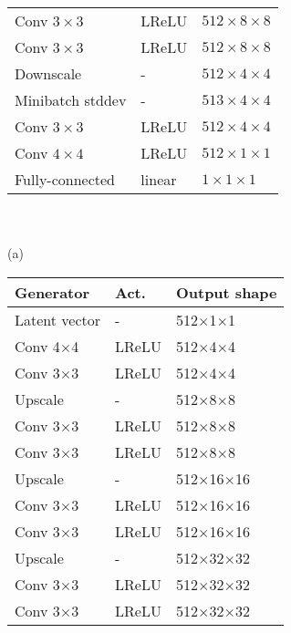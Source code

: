 \documentclass[journal, onecolumn]{IEEEtran}
\begin{document}
\begin{table}[H]
\begin{minipage}[t]{0.48\linewidth}
\begin{adjustbox}{width=0.72\columnwidth,left}
{\begin{tabular}[t]{|lll|}
Conv $3\times3$      & LReLU & $512\times8\times8$      \\
Conv $3\times3$      & LReLU & $512\times8\times8$      \\ 
Downscale & -      & $512\times4\times4$  \\ \hline

Minibatch stddev &- & $513\times4\times4$  \\ 
Conv $3\times3$      & LReLU & $512\times4\times4$      \\
Conv $4\times4$      & LReLU & $512\times1\times1$      \\ 
Fully-connected & linear      & $1\times1\times1$  \\ \hline
\end{tabular}
\\
\\
(a)
}
\end{adjustbox}
\end{minipage}
\hspace{-0.95cm}
\begin{minipage}[t]{0.48\linewidth}
\centering
\begin{adjustbox}{width=0.72\columnwidth,center}
\noindent\parbox[t][][t]{0.74\linewidth}{
\begin{tabular}[t]{|lll|}
\hline
\textbf{Generator}       & Act.  & Output shape \\ \hline
Latent vector  & -      & 512$\times$1$\times$1      \\
Conv 4$\times$4      & LReLU & 512$\times$4$\times$4     \\
Conv 3$\times$3      & LReLU & 512$\times$4$\times$4      \\ \hline

Upscale          & -      & 512$\times$8$\times$8  \\
Conv 3$\times$3      & LReLU & 512$\times$8$\times$8      \\
Conv 3$\times$3      & LReLU & 512$\times$8$\times$8      \\ \hline

Upscale          & -      & 512$\times$16$\times$16  \\
Conv 3$\times$3      & LReLU & 512$\times$16$\times$16      \\
Conv 3$\times$3      & LReLU & 512$\times$16$\times$16      \\ \hline

Upscale          & -      & 512$\times$32$\times$32  \\
Conv 3$\times$3      & LReLU & 512$\times$32$\times$32      \\
Conv 3$\times$3      & LReLU & 512$\times$32$\times$32      \\ \hline


\end{tabular}}
\end{adjustbox}
\end{minipage}
\end{table}
\end{document}
